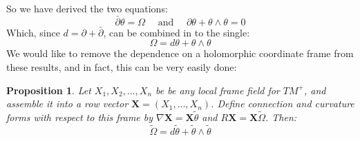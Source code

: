 \documentclass[11pt]{amsart}
\newtheorem{prop}[subsection]{Proposition}
\theoremstyle{definition}
\def \del{ \partial }
\def \delbar{ \bar{\partial} }
\def \thetasquig{ \tilde{\theta} }
\def \Omegasquig{ \tilde{\Omega} }
\def \bldX{ \mathbf{X} }
\begin{document}
So we have derived the two equations:
%
$$ \delbar \theta = \Omega \quad \text{ and } \quad \del \theta + \theta \wedge \theta = 0 $$
%
Which, since $d = \del + \delbar$, can be combined in to the single:
%
$$ \Omega = d \theta + \theta \wedge \theta $$
%
We would like to remove the dependence on a holomorphic coordinate frame from these results, and in fact, this can be very easily done:
%
\begin{prop} Let $X_1, X_2, \ldots, X_n$ be be any local frame field for $TM^{+}$, and assemble it into a row vector $\bldX = (X_1, \ldots, X_n)$. Define connection and curvature forms with respect to this frame by $ \nabla \bldX = \bldX \thetasquig $ and $ R \bldX = \bldX \Omegasquig $.  Then:
%
$$ \Omegasquig = d \thetasquig + \thetasquig \wedge \thetasquig $$
%
\end{prop}
\end{document}
